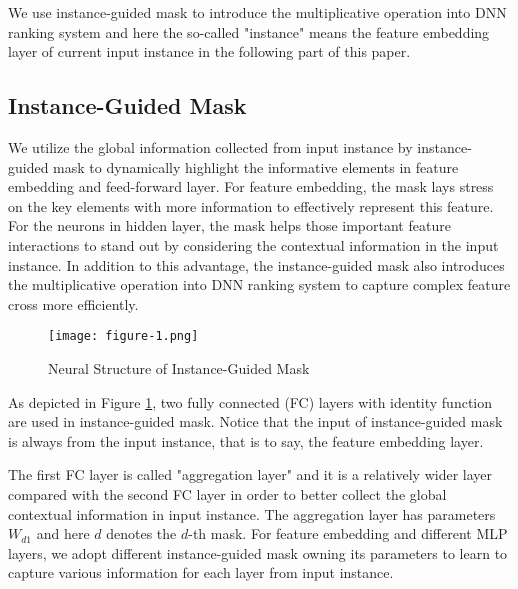 \documentclass[sigconf]{acmart}
\begin{document}
We use instance-guided mask to introduce the multiplicative operation into DNN ranking system and here the so-called "instance" means the feature embedding layer of current input instance in the following part of this paper.


\subsection{Instance-Guided Mask}
We utilize the global information collected from input instance by instance-guided mask to dynamically highlight the informative elements in feature embedding and feed-forward layer. For feature embedding, the mask lays stress on the key elements with more information to effectively represent this feature. For the neurons in hidden layer, the mask helps those important feature interactions to stand out by considering the contextual information in the input instance. In addition to this advantage, the instance-guided mask also introduces the multiplicative operation into DNN ranking system to capture complex feature cross more efficiently.


\begin{figure}[!]
  \setlength{\abovecaptionskip}{1pt}
  \texttt{[image: figure-1.png]}
  \caption{Neural Structure of Instance-Guided Mask}
  \label{Fig.Instance-Guided}
\end{figure}

 As depicted in Figure \ref{Fig.Instance-Guided}, two fully connected (FC) layers with identity function are used in instance-guided mask. Notice that the input of instance-guided mask is always from the input instance, that is to say, the feature embedding layer.



 The first FC layer is called "aggregation layer" and it is a relatively wider layer compared with the second FC layer in order to better collect the global  contextual information in input instance. The aggregation layer has parameters $W_{d1}$ and here $d$ denotes the $d$-th mask. For feature embedding and different MLP layers, we adopt different instance-guided mask owning its parameters to learn to capture various information for each layer from input instance.
\end{document}

